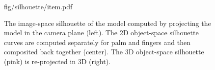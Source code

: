 \begin{figure}[t!]
\centering
\begin{overpic} 
[width=\linewidth]
{fig/silhouette/item.pdf}
\end{overpic}
\caption{
% 
% 
The image-space silhouette of the model computed by projecting the model in the camera plane (left).
The 2D object-space silhouette curves are computed separately for palm and fingers and then composited back together (center).
The 3D object-space silhouette (pink) is re-projected in 3D (right).
% 
% 
} 
\label{fig:silhouette}
\end{figure}